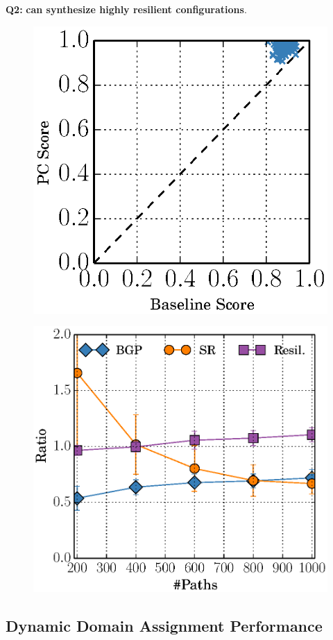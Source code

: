\textbf{Q2:} 
\textbf{\name can synthesize highly resilient configurations}.

\begin{figure}
\centering
\begin{minipage}{.5\textwidth}
  \centering
  \includegraphics[width=.6\linewidth]{figures/ospfbaselineresilience.eps}
  \label{fig:ospfresbaseline}
\end{minipage}%
\begin{minipage}{.5\textwidth}
  \centering
  \includegraphics[width=.6\linewidth]{figures/ratioMCMC.eps}
  \label{fig:mcmceval}
\end{minipage}
\end{figure}

\subsection{Dynamic Domain Assignment Performance} \label{sec:mcmceval}

